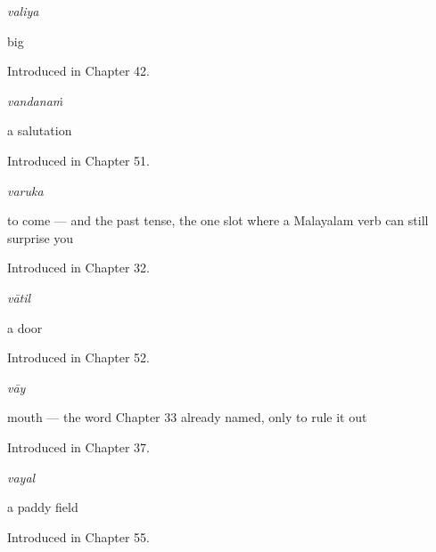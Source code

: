 \noindent\begin{minipage}[t]{\linewidth}
\raggedright
\textbf{}\enspace\emph{valiya}\par
\small big\par
\footnotesize Introduced in Chapter 42.
\end{minipage}\par\medskip

\noindent\begin{minipage}[t]{\linewidth}
\raggedright
\textbf{}\enspace\emph{vandanaṁ}\par
\small a salutation\par
\footnotesize Introduced in Chapter 51.
\end{minipage}\par\medskip

\noindent\begin{minipage}[t]{\linewidth}
\raggedright
\textbf{}\enspace\emph{varuka}\par
\small to come — and the past tense, the one slot where a Malayalam verb can still surprise you\par
\footnotesize Introduced in Chapter 32.
\end{minipage}\par\medskip

\noindent\begin{minipage}[t]{\linewidth}
\raggedright
\textbf{}\enspace\emph{vātil}\par
\small a door\par
\footnotesize Introduced in Chapter 52.
\end{minipage}\par\medskip

\noindent\begin{minipage}[t]{\linewidth}
\raggedright
\textbf{}\enspace\emph{vāy}\par
\small mouth — the word Chapter 33 already named, only to rule it out\par
\footnotesize Introduced in Chapter 37.
\end{minipage}\par\medskip

\noindent\begin{minipage}[t]{\linewidth}
\raggedright
\textbf{}\enspace\emph{vayal}\par
\small a paddy field\par
\footnotesize Introduced in Chapter 55.
\end{minipage}\par\medskip

